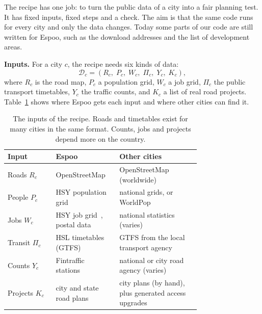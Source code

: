 \documentclass{article}
\begin{document}
The recipe has one job: to turn the public data of a city into a fair planning test. It has fixed inputs, fixed steps and a check. The aim is that the same code runs for every city and only the data changes. Today some parts of our code are still written for Espoo, such as the download addresses and the list of development areas.

\textbf{Inputs.} For a city $c$, the recipe needs six kinds of data:
\begin{equation}
\mathcal{D}_c=\left(R_c,\;P_c,\;W_c,\;\Pi_c,\;Y_c,\;K_c\right),
\end{equation}
where $R_c$ is the road map, $P_c$ a population grid, $W_c$ a job grid, $\Pi_c$ the public transport timetables, $Y_c$ the traffic counts, and $K_c$ a list of real road projects. Table~\ref{tab:inputs} shows where Espoo gets each input and where other cities can find it.

\begin{table}[t]
\caption{The inputs of the recipe. Roads and timetables exist for many cities in the same format. Counts, jobs and projects depend more on the country.}
\label{tab:inputs}
\centering\small
\begin{tabular}{@{}lp{0.33\linewidth}p{0.42\linewidth}@{}}
\toprule
Input & Espoo & Other cities \\
\midrule
Roads $R_c$ & OpenStreetMap~\cite{haklay2008} & OpenStreetMap (worldwide) \\
People $P_c$ & HSY population grid~\cite{hsy2026a} & national grids, or WorldPop~\cite{tatem2017} \\
Jobs $W_c$ & HSY job grid~\cite{hsy2026b}, postal data~\cite{statfi2026} & national statistics (varies) \\
Transit $\Pi_c$ & HSL timetables (GTFS)~\cite{hsl2026} & GTFS from the local transport agency \\
Counts $Y_c$ & Fintraffic stations~\cite{fintraffic2026} & national or city road agency (varies) \\
Projects $K_c$ & city and state road plans & city plans (by hand), plus generated access upgrades \\
\bottomrule
\end{tabular}
\end{table}
\end{document}
